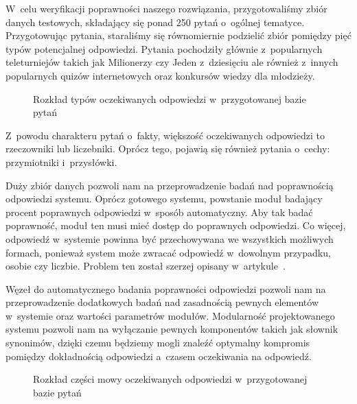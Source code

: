 W~celu weryfikacji poprawności naszego rozwiązania, przygotowaliśmy zbiór danych testowych, składający się ponad 250 pytań o~ogólnej tematyce. Przygotowując pytania, staraliśmy się równomiernie podzielić zbiór pomiędzy pięć typów potencjalnej odpowiedzi. Pytania pochodziły głównie z~popularnych teleturniejów takich jak Milionerzy czy Jeden z~dziesięciu ale również z~innych popularnych quizów internetowych oraz konkursów wiedzy dla młodzieży.

\begin{figure}[h!]
    \label{fig:rozklad-typow-odpowiedzi}  
    \caption{Rozkład typów oczekiwanych odpowiedzi w~przygotowanej bazie pytań}
\end{figure}

Z~powodu charakteru pytań o~fakty, większość oczekiwanych odpowiedzi to rzeczowniki lub liczebniki. Oprócz tego, pojawią się również pytania o~cechy: przymiotniki i~przysłówki.

Duży zbiór danych pozwoli nam na przeprowadzenie badań nad poprawnością odpowiedzi systemu. Oprócz gotowego systemu, powstanie moduł badający procent poprawnych odpowiedzi w~sposób automatyczny. Aby tak badać poprawność, moduł ten musi mieć dostęp do poprawnych odpowiedzi. Co więcej, odpowiedź w~systemie powinna być przechowywana we wszystkich możliwych formach, ponieważ system może zwracać odpowiedź w~dowolnym przypadku, osobie czy liczbie. Problem ten został szerzej opisany w~artykule~\cite{brill2002analysis}.

Węzeł do automatycznego badania poprawności odpowiedzi pozwoli nam na przeprowadzenie dodatkowych badań nad zasadnością pewnych elementów w~systemie oraz wartości parametrów modułów. Modularność projektowanego systemu pozwoli nam na wyłączanie pewnych komponentów takich jak słownik synonimów, dzięki czemu będziemy mogli znaleźć optymalny kompromis pomiędzy dokładnością odpowiedzi a~czasem oczekiwania na odpowiedź.

\begin{figure}[h!]
    \label{fig:rozklad-typow-odpowiedzi2}  
    \caption{Rozkład części mowy oczekiwanych odpowiedzi w~przygotowanej bazie pytań}
\end{figure}